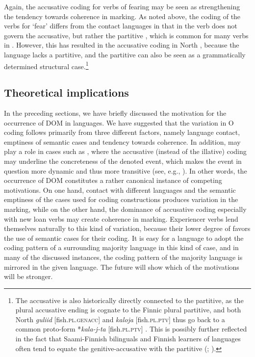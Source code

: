 \documentclass[output=paper]{LSP/langsci}
\begin{document}
Again, the accusative coding for verbs of fearing may be seen as strengthening the tendency towards coherence in marking. As noted above, the coding of the verbs for ‘fear’ differs from the contact languages in that in  the verb does not govern the accusative, but rather the partitive , which is common for many  verbs in . However, this has resulted in the accusative coding in North , because the language lacks a partitive, and the  partitive can also be seen as a grammatically determined structural case.\footnote{The  accusative is also historically directly connected to the  partitive, as the  plural accusative ending is cognate to the Finnic plural partitive, and both North  \textit{guliid} [fish.\textsc{pl}.\textsc{genacc}]  and  \textit{kaloja} [fish.\textsc{pl}.\textsc{ptv}]  thus go back to a common proto-form *\textit{kala-j-ta} [fish.\textsc{pl}.\textsc{ptv}] \citep[68, 203--206]{Sammallahti1998Saami}. This is possibly further reflected in the fact that Saami-Finnish bilinguals and Finnish learners of  languages often tend to equate the  genitive-accusative with the  partitive (\citealt[131]{Magga2002North}; \citealt[78–79]{Lansman2009Oahppiid}).}

\subsection{Theoretical implications}
\label{16-ki-sec:4-5}

In the preceding sections, we have briefly discussed the motivation for the occurrence of DOM in  languages. We have suggested that the variation in O coding follows primarily from three different factors, namely language contact, emptiness of semantic cases and tendency towards coherence. In addition,  may play a role in cases such as , where the accusative (instead of the illative) coding may underline the concreteness of the denoted event, which makes the event in question more dynamic and thus more transitive (see, e.g., \citealt[76]{Givon1995Functionalism}). In other words, the occurrence of DOM constitutes a rather canonical instance of competing motivations. On one hand, contact with different languages and the semantic emptiness of the cases used for coding  constructions produces variation in the marking, while on the other hand, the dominance of accusative coding especially with new loan verbs may create coherence in marking. Experiencer verbs lend themselves naturally to this kind of variation, because their lower degree of  favors the use of semantic cases for their coding. It is easy for a language to adopt the coding pattern of a surrounding majority language in this kind of case, and in many of the discussed instances, the coding pattern of the majority language is mirrored in the given  language. The future will show which of the motivations will be stronger.
\end{document}
